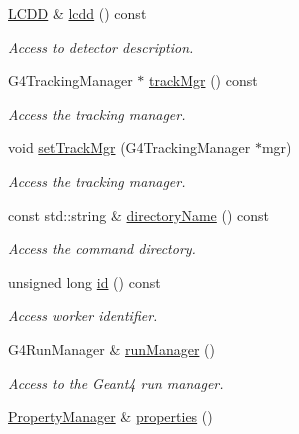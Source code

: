 \begin{DoxyCompactItemize}
\hyperlink{class_d_d4hep_1_1_simulation_1_1_geant4_kernel_a190e652b62ebce3db3372c4265ffa5a3}{L\+C\+DD} \& \hyperlink{class_d_d4hep_1_1_simulation_1_1_geant4_kernel_ad58adb3734f2701198b8915a80cf4cdc}{lcdd} () const
\begin{DoxyCompactList}\small\item\em Access to detector description. \end{DoxyCompactList}\item 
G4\+Tracking\+Manager $\ast$ \hyperlink{class_d_d4hep_1_1_simulation_1_1_geant4_kernel_aad8ca2fc43ef4a468bd64ed1e0b164f1}{track\+Mgr} () const
\begin{DoxyCompactList}\small\item\em Access the tracking manager. \end{DoxyCompactList}\item 
void \hyperlink{class_d_d4hep_1_1_simulation_1_1_geant4_kernel_aa5d1173163b58ade76d90a6a449b2357}{set\+Track\+Mgr} (G4\+Tracking\+Manager $\ast$mgr)
\begin{DoxyCompactList}\small\item\em Access the tracking manager. \end{DoxyCompactList}\item 
const std\+::string \& \hyperlink{class_d_d4hep_1_1_simulation_1_1_geant4_kernel_ad922e8f9b10efb7503fad89764d98612}{directory\+Name} () const
\begin{DoxyCompactList}\small\item\em Access the command directory. \end{DoxyCompactList}\item 
unsigned long \hyperlink{class_d_d4hep_1_1_simulation_1_1_geant4_kernel_a65e6428708ccaa9e0c4545b57437246d}{id} () const
\begin{DoxyCompactList}\small\item\em Access worker identifier. \end{DoxyCompactList}\item 
G4\+Run\+Manager \& \hyperlink{class_d_d4hep_1_1_simulation_1_1_geant4_kernel_aa01093467efb9b3a4f9179ba22ac7899}{run\+Manager} ()
\begin{DoxyCompactList}\small\item\em Access to the Geant4 run manager. \end{DoxyCompactList}\item 
\hyperlink{class_d_d4hep_1_1_property_manager}{Property\+Manager} \& \hyperlink{class_d_d4hep_1_1_simulation_1_1_geant4_kernel_a39d0b3dcebed9c0ec950410df346710b}{properties} ()

\end{DoxyCompactItemize}
